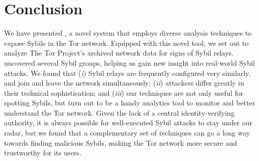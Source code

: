 \section{Conclusion}
\label{sec:conclusion}
We have presented \sys, a novel system that employs diverse analysis techniques
to expose Sybils in the Tor network.  Equipped with this novel tool, we set out
to analyze The Tor Project's archived network data for signs of Sybil relays.
\Sys uncovered several Sybil groups, helping us gain new insight into real-world
Sybil attacks.  We found that (\emph{i}) Sybil relays are frequently configured
very similarly, and join and leave the network simultaneously; (\emph{ii})
attackers differ greatly in their technical sophistication; and (\emph{iii}) our
techniques are not only useful for spotting Sybils, but turn out to be a handy
analytics tool to monitor and better understand the Tor network.  Given the lack
of a central identity-verifying authority, it is always possible for
well-executed Sybil attacks to stay under our radar, but we found that a
complementary set of techniques can go a long way towards finding malicious
Sybils, making the Tor network more secure and trustworthy for its users.

